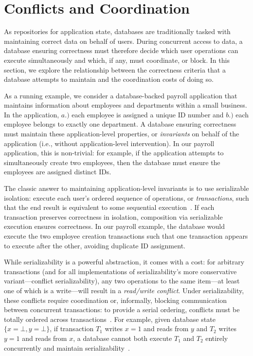 
\section{Conflicts and Coordination}
\label{sec:motivation}

As repositories for application state, databases are traditionally
tasked with maintaining correct data on behalf of users. During
concurrent access to data, a database ensuring correctness must
therefore decide which user operations can execute simultaneously and
which, if any, must coordinate, or block. In this section, we explore
the relationship between the correctness criteria that a database attempts
to maintain and the coordination costs of doing so.

 As a running example, we consider a
database-backed payroll application that maintains information about
employees and departments within a small business. In the application,
$a.)$ each employee is assigned a unique ID number and $b.)$ each
employee belongs to exactly one department. A database ensuring correctness must
maintain these application-level properties, or \textit{invariants} on
behalf of the application (i.e., without application-level
intervention). In our payroll application, this is non-trivial: for
example, if the application attempts to simultaneously create two
employees, then the database must ensure the employees are
assigned distinct IDs.

 The classic answer to
maintaining application-level invariants is to use serializable
isolation: execute each user's ordered sequence of operations, or
\textit{transactions}, such that the end result is equivalent to some
sequential execution~\cite{tamer-book,bernstein-book,gray-virtues}. If
each transaction preserves correctness in isolation, composition via
serializable execution ensures correctness. In our payroll example,
the database would execute the two employee creation transactions such
that one transaction appears to execute after the other, avoiding 
duplicate ID assignment.



While serializability is a powerful abstraction, it comes with a cost:
for arbitrary transactions (and for all implementations of
serializability's more conservative variant---conflict
serializability), any two operations to the same item---at least one
of which is a write---will result in a \textit{read/write
  conflict}. Under serializability, these conflicts require
coordination or, informally, blocking communication between concurrent
transactions: to provide a serial ordering, conflicts must be totally
ordered across transactions~\cite{bernstein-book}. For example, given database state
$\{x=\bot, y=\bot\}$, if transaction $T_1$ writes $x=1$ and reads from
$y$ and $T_2$ writes $y=1$ and reads from $x$, a database cannot both
execute $T_1$ and $T_2$ entirely concurrently and maintain
serializability~\cite{davidson-survey,hat-vldb}.

